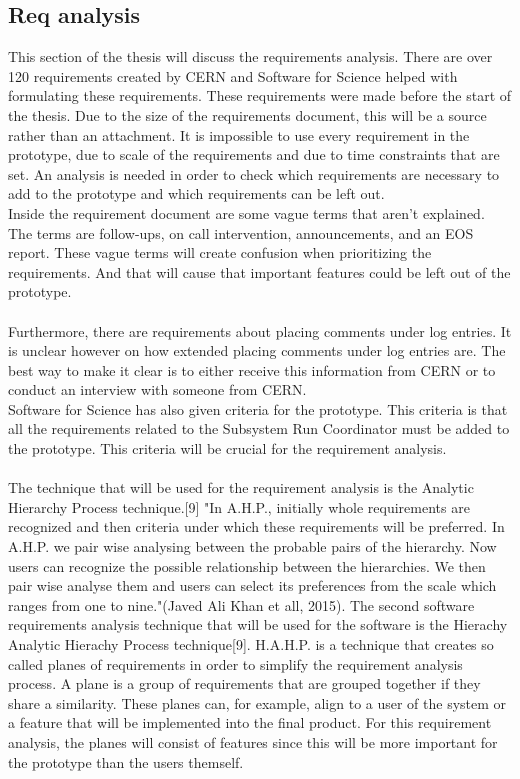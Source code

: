 \documentclass[paper=a4, fontsize=11pt,twoside]{scrartcl}	%
\begin{document}
\subsection{Req analysis}
This section of the thesis will discuss the requirements analysis. There are over 120 requirements created by CERN and  Software for Science helped with formulating these requirements. These requirements were made before the start of the thesis. Due to the size of the requirements document, this will be a source rather than an attachment. It is impossible to use every requirement in the prototype, due to scale of the requirements and due to time constraints that are set. An analysis is needed in order to check which requirements are necessary to add to the prototype and which requirements can be left out.  \\
Inside the requirement document are some vague terms that aren't explained. The terms are follow-ups, on call intervention, announcements, and an EOS report. These vague terms will create confusion when prioritizing the requirements. And that will cause that important features could be left out of the prototype. \\ \\
Furthermore, there are requirements about placing comments under log entries. It is unclear however on how extended placing comments under log entries are. The best way to make it clear is to either receive this information from CERN or to conduct an interview with someone from CERN.  \\ 
Software for Science has also given criteria for the prototype. This criteria is that all the requirements related to the Subsystem Run Coordinator must be added to the prototype. This criteria will be crucial for the requirement analysis. \\ \\
The technique that will be used for the requirement analysis is the Analytic Hierarchy Process technique.[9] "In A.H.P., initially whole requirements are recognized and then criteria under which these requirements will be preferred. In A.H.P. we pair wise analysing  between  the  probable  pairs  of  the  hierarchy. 
Now users can recognize the possible relationship between 
the hierarchies. We then pair wise analyse them and users can select its preferences from the scale which ranges from 
one to nine."(Javed Ali Khan et all, 2015). The second software requirements analysis technique that will be used for the software is the Hierachy Analytic Hierachy Process technique[9]. H.A.H.P. is a technique that creates so called planes of requirements in order to simplify the requirement analysis process. A plane is a group of requirements that are grouped together if they share a similarity. These planes can, for example, align to a user of the system or a feature that will be implemented into the final product. For this requirement analysis, the planes will consist of features since this will be more important for the prototype than the users themself. \\ \\
\end{document}

